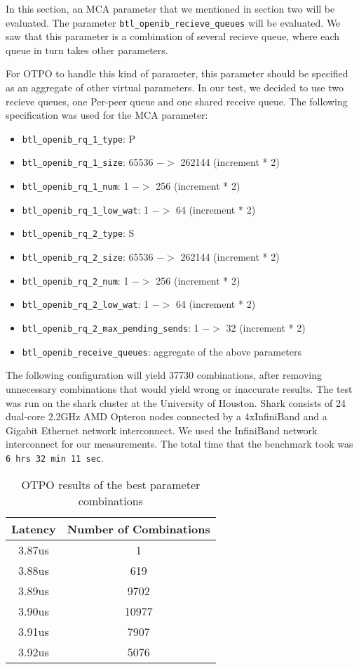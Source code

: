 In this section, an MCA parameter that we mentioned in section two will be
evaluated. The parameter {\tt btl\_openib\_recieve\_queues} will be
evaluated. We saw that this parameter is a combination of several recieve
queue, where each queue in turn takes other parameters. 

For OTPO to handle this kind of parameter, this parameter should be specified
as an aggregate of other virtual parameters. In our test, we decided to use
two recieve queues, one Per-peer queue and one shared receive queue. The
following specification was used for the MCA parameter:

\begin{itemize}
\item {\tt btl\_openib\_rq\_1\_type}: P
\item {\tt btl\_openib\_rq\_1\_size}: 65536 $->$ 262144 (increment * 2)
\item {\tt btl\_openib\_rq\_1\_num}: 1 $->$ 256 (increment * 2)
\item {\tt btl\_openib\_rq\_1\_low\_wat}: 1 $->$ 64 (increment * 2)
\item {\tt btl\_openib\_rq\_2\_type}: S
\item {\tt btl\_openib\_rq\_2\_size}: 65536 $->$ 262144 (increment * 2)
\item {\tt btl\_openib\_rq\_2\_num}: 1 $->$ 256 (increment * 2)
\item {\tt btl\_openib\_rq\_2\_low\_wat}: 1 $->$ 64 (increment * 2)
\item {\tt btl\_openib\_rq\_2\_max\_pending\_sends}: 1 $->$ 32 (increment * 2)
\item {\tt btl\_openib\_receive\_queues}: aggregate of the above parameters
\end{itemize}

The following configuration will yield 37730 combinations, after removing
unnecessary combinations that would yield wrong or inaccurate results. The
test was run on the shark cluster at the University of Houston. Shark consists
of 24 dual-core 2.2GHz AMD Opteron nodes connected by a 4xInfiniBand and a
Gigabit Ethernet network interconnect. We used the InfiniBand network
interconnect for our measurements. The total time that the benchmark took was
{\tt 6 hrs 32 min 11 sec}.

\begin{table}[tb]
\centering
\begin{tabular}{|c|c|} \hline
Latency & Number of Combinations \\
\hline
3.87us  & 1\\
\hline
3.88us  & 619\\
\hline
3.89us  & 9702\\
\hline
3.90us  & 10977\\
\hline
3.91us  & 7907\\
\hline
3.92us  & 5076\\
\hline
\end{tabular}  
\caption{OTPO results of the best parameter combinations}
\label{table:results} 
\end{table}

